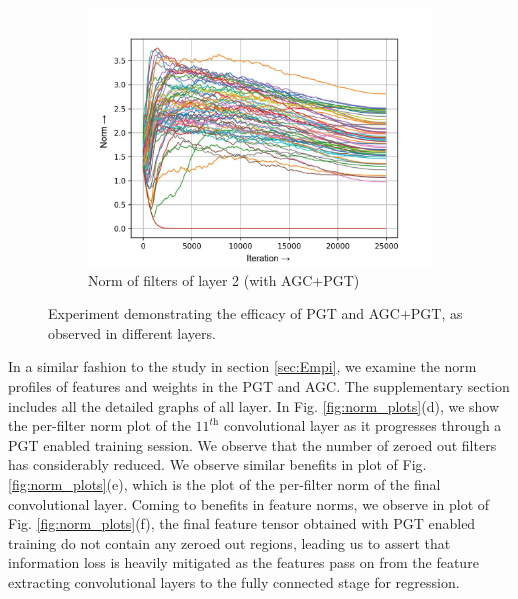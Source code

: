 \documentclass[times,sort&compress]{elsarticle}
\begin{document}
\begin{figure}[t]
\begin{subfigure}[t]{0.32\textwidth}
\includegraphics[width=\linewidth]{agc_pgt-w-layer-1-2}
\caption{Norm of filters of layer 2 (with AGC+PGT)}
\end{subfigure}
\captionsetup{font=normalsize}
\caption{ Experiment demonstrating the efficacy of PGT and AGC+PGT, as observed in
different layers. }
\label{fig:agc_pgt}
\end{figure}





In a similar fashion to the study in section \ref{sec:Empi}, we examine the norm
profiles of features and weights in the PGT and AGC. The supplementary section includes
all the detailed graphs of all layer. In Fig. \ref{fig:norm_plots}(d), we show the
per-filter norm plot of the $11^\textit{th}$ convolutional layer as it progresses
through a PGT enabled training session. We observe that the number of zeroed out filters
has considerably reduced. We observe similar benefits in plot of Fig.
\ref{fig:norm_plots}(e), which is the plot of the per-filter norm of the final
convolutional layer. Coming to benefits in feature norms, we observe in plot of Fig.
\ref{fig:norm_plots}(f), the final feature tensor obtained with PGT enabled training do
not contain any zeroed out regions, leading us to assert that information loss is
heavily mitigated as the features pass on from the feature extracting convolutional
layers to the fully connected stage for regression.
\end{document}
